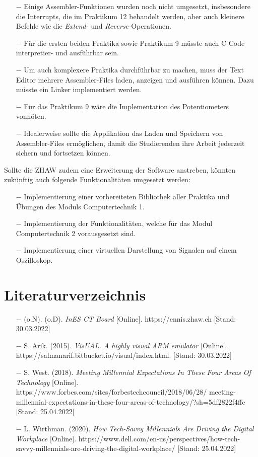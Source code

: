 \documentclass[10pt]{article}
\begin{document}
\begin{itemize}
	\item[$-$] Einige Assembler-Funktionen wurden noch nicht umgesetzt, insbesondere die Interrupts, die im Praktikum 12 behandelt werden, aber auch kleinere Befehle wie die \emph{Extend-} und \emph{Reverse-}Operationen.
	\item[$-$] Für die ersten beiden Praktika sowie Praktikum 9 müsste auch C-Code interpretier- und ausführbar sein.
	\item[$-$] Um auch komplexere Praktika durchführbar zu machen, muss der Text Editor mehrere Assembler-Files laden, anzeigen und ausführen können. Dazu müsste ein Linker implementiert werden.
	\item[$-$] Für das Praktikum 9 wäre die Implementation des Potentiometers vonnöten.
	\item[$-$] Idealerweise sollte die Applikation das Laden und Speichern von Assembler-Files ermöglichen, damit die Studierenden ihre Arbeit jederzeit sichern und fortsetzen können.


\end{itemize}


{\parindent0pt Sollte die ZHAW zudem eine Erweiterung der Software anstreben, könnten zukünftig auch folgende Funktionalitäten umgesetzt werden: }
\begin{itemize}
\item[$-$] Implementierung einer vorbereiteten Bibliothek aller Praktika und Übungen des Moduls \glqq Computertechnik 1\grqq. 
\item[$-$] Implementierung der Funktionalitäten, welche für das Modul \glqq Computertechnik 2\grqq{} vorausgesetzt sind. 
\item[$-$] Implementierung einer virtuellen Darstellung von Signalen auf einem Oszilloskop.
\end{itemize}

\newpage
\section{Literaturverzeichnis}

\begin{itemize}

\item[$-$] (o.N). (o.D). \emph{InES CT Board} [Online]. https://ennis.zhaw.ch [Stand: 30.03.2022]
\item[$-$] S. Arik. (2015). \emph{VisUAL. A highly visual ARM emulator} [Online]. https://salmanarif.bitbucket.io/visual/index.html. [Stand: 30.03.2022]
\item[$-$] S. West. (2018). \emph{Meeting Millennial Expectations In These Four Areas Of Technology} [Online]. https://www.forbes.com/sites/forbestechcouncil/2018/06/28/ meeting-millennial-expectations-in-these-four-areas-of-technology/?sh=5df2822f4ffc [Stand: 25.04.2022]
\item[$-$] L. Wirthman. (2020). \emph{How Tech-Savvy Millennials Are Driving the Digital Workplace} [Online]. https://www.dell.com/en-us/perspectives/how-tech-savvy-millennials-are-driving-the-digital-workplace/ [Stand: 25.04.2022]

\end{itemize}
\end{document}
